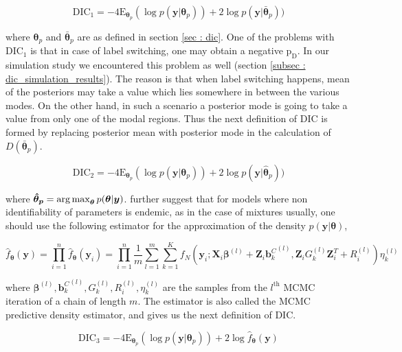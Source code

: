 \begin{equation}
\label{eq : DIC1}
\text{DIC}_1 = -4\text{E}_{\boldsymbol{\theta}_p} (\log{p(\boldsymbol{y}|\boldsymbol{\theta}_p)}) + 2\log{p(\boldsymbol{y}|\boldsymbol{\bar{\theta}}_p)})
\end{equation}

where 
$\boldsymbol{\theta}_p$ and $\boldsymbol{\bar{\theta}}_p$ are as defined in section \ref{sec : dic}. One of the problems with $\text{DIC}_1$ is that in case of label switching, one may obtain a negative $\text{p}_\text{D}$. In our simulation study we encountered this problem as well (section \ref{subsec : dic_simulation_results}). The reason is that when label switching happens, mean of the posteriors may take a value which lies somewhere in between the various modes. On the other hand, in such a scenario a posterior mode is going to take a value from only one of the modal regions. Thus the next definition of DIC is formed by replacing posterior mean with posterior mode in the calculation of $D(\boldsymbol{\bar{\theta}}_p)$.

\begin{equation}
\label{eq : DIC2}
\text{DIC}_2 = -4\text{E}_{\boldsymbol{\theta}_p} (\log{p(\boldsymbol{y}|\boldsymbol{\theta}_p)}) + 2\log{p(\boldsymbol{y}|\boldsymbol{\hat{\theta}}_p)})
\end{equation}

where
$\boldsymbol{\hat{\theta}_p} = \operatorname*{arg\,max}_{\boldsymbol{\theta}}p(\boldsymbol{\theta}|\boldsymbol{y})$. \citet{celeux_deviance_2006} further suggest that for models where non identifiability of parameters is endemic, as in the case of mixtures usually, one should use the following estimator for the approximation of the density $p(\boldsymbol{y}|\boldsymbol{\theta})$,

$$\hat{f}_{\boldsymbol{\theta}}(\boldsymbol{y}) = \prod_{i=1}^n \hat{f}_{\boldsymbol{\theta}}(\boldsymbol{y}_i) = \prod_{i=1}^n \frac 1 m \sum_{l=1}^m \sum_{k=1}^K f_N(\boldsymbol{y}_i; \boldsymbol{X}_i\boldsymbol{\beta}^{(l)} + \boldsymbol{Z}_i {\boldsymbol{b}_k^C}^{(l)}, \boldsymbol{Z}_{i} G_k^{(l)} \boldsymbol{Z}_{i}^T+ R_i^{(l)}) \eta_k^{(l)}$$

where $\boldsymbol{\beta}^{(l)}, {\boldsymbol{b}_k^C}^{(l)}, G_k^{(l)}, R_i^{(l)}, \eta_k^{(l)}$ are the samples from the $l^{\text{th}}$ MCMC iteration of a chain of length $m$.  The estimator is also called the MCMC predictive density estimator, and gives us the next definition of DIC.

\begin{equation}
\label{eq : DIC3}
\text{DIC}_3 =-4\text{E}_{\boldsymbol{\theta}_p} (\log{p(\boldsymbol{y}|\boldsymbol{\theta}_p)}) + 2\log{\hat{f}_{\boldsymbol{\theta}}(\boldsymbol{y})}
\end{equation}

